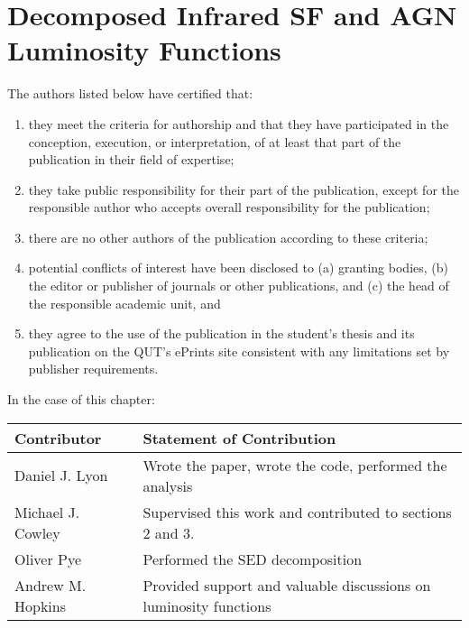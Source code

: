 \chapter{Decomposed Infrared SF and AGN Luminosity Functions} \label{Sec: Paper Chapter}

The authors listed below have certified that:

\begin{enumerate}
    \vspace{-0.35em}
    \item they meet the criteria for authorship and that they have participated in the conception, execution, or interpretation, of at least that part of the publication in their field of expertise;

    \vspace{-0.35em}
    \item they take public responsibility for their part of the publication, except for the responsible author who accepts overall responsibility for the publication;

    \vspace{-0.35em}
    \item there are no other authors of the publication according to these criteria;

    \vspace{-0.35em}
    \item potential conflicts of interest have been disclosed to (a) granting bodies, (b) the editor or publisher of journals or other publications, and (c) the head of the responsible academic unit, and

    \vspace{-0.35em}
    \item they agree to the use of the publication in the student’s thesis and its publication on the  QUT’s ePrints site consistent with any limitations set by publisher requirements.
\end{enumerate}

\noindent In the case of this chapter:

\begin{table}
    \centering
    \begin{tabular}{|p{4cm}|p{9cm}|}
        \hline
        \textbf{Contributor} & \textbf{Statement of Contribution} \\
        \hline 
        Daniel J. Lyon & Wrote the paper, wrote the code, performed the analysis \\
        \hline 
        Michael J. Cowley & Supervised this work and contributed to sections 2 and 3.\\
        \hline
        Oliver Pye & Performed the SED decomposition \\
        \hline
        Andrew M. Hopkins & Provided support and valuable discussions on luminosity functions\\
        \hline
    \end{tabular}
\end{table}
